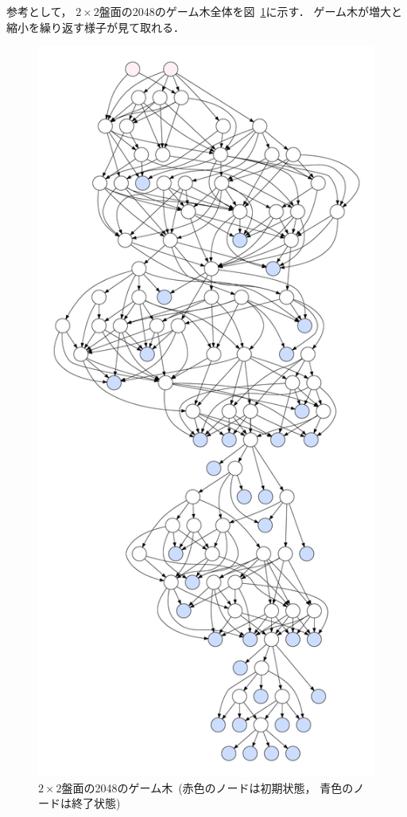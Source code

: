参考として， $2\times2$盤面の2048のゲーム木全体を図~\ref{fig:game_tree}に示す．
ゲーム木が増大と縮小を繰り返す様子が見て取れる．
\begin{figure}[t]
    \centering
    \includegraphics[width=0.7\linewidth{}]{figures/tree.pdf}
    \caption{$2\times2$盤面の2048のゲーム木~(赤色のノードは初期状態， 青色のノードは終了状態)}
    \label{fig:game_tree}
\end{figure}